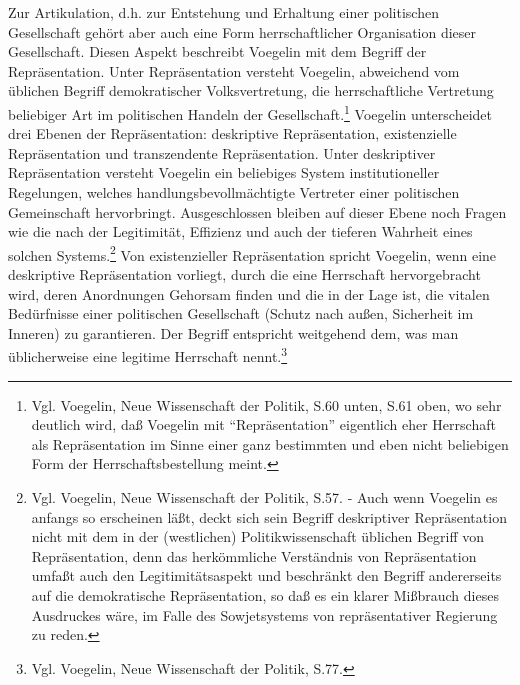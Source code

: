Zur Artikulation, d.h. zur Entstehung und Erhaltung einer politischen
Gesellschaft gehört aber auch eine Form herrschaftlicher Organisation dieser
Gesellschaft. Diesen Aspekt beschreibt Voegelin mit dem Begriff der
Repräsentation. Unter Repräsentation versteht Voegelin, abweichend vom üblichen
Begriff demokratischer Volksvertretung, die herrschaftliche Vertretung
beliebiger Art im politischen Handeln der Gesellschaft.\footnote{Vgl.
  Voegelin, Neue Wissenschaft der Politik, S.60 unten, S.61 oben, wo sehr
  deutlich wird, daß Voegelin mit "`Repräsentation"' eigentlich eher
  Herrschaft als Repräsentation im Sinne einer ganz bestimmten und eben nicht
  beliebigen Form der Herrschaftsbestellung meint.} Voegelin unterscheidet drei
Ebenen der Repräsentation: deskriptive Repräsentation, existenzielle
Repräsentation und transzendente Repräsentation. Unter deskriptiver
Repräsentation versteht Voegelin ein beliebiges System institutioneller
Regelungen, welches handlungsbevollmächtigte Vertreter einer politischen
Gemeinschaft hervorbringt. Ausgeschlossen bleiben auf dieser Ebene noch Fragen
wie die nach der Legitimität, Effizienz und auch der tieferen Wahrheit eines
solchen Systems.\footnote{Vgl. Voegelin, Neue Wissenschaft der Politik, S.57.
  - Auch wenn Voegelin es anfangs so erscheinen läßt, deckt sich sein Begriff
  deskriptiver Repräsentation nicht mit dem in der (westlichen)
  Politikwissenschaft üblichen Begriff von Repräsentation, denn das
  herkömmliche Verständnis von Repräsentation umfaßt auch den
  Legitimitätsaspekt und beschränkt den Begriff andererseits auf die
  demokratische Repräsentation, so daß es ein klarer Mißbrauch dieses
  Ausdruckes wäre, im Falle des Sowjetsystems von repräsentativer Regierung zu
  reden.} Von existenzieller Repräsentation spricht Voegelin, wenn eine
deskriptive Repräsentation vorliegt, durch die eine Herrschaft hervorgebracht
wird, deren Anordnungen Gehorsam finden und die in der Lage ist, die vitalen
Bedürfnisse einer politischen Gesellschaft (Schutz nach außen, Sicherheit im
Inneren) zu garantieren. Der Begriff entspricht weitgehend dem, was man
üblicherweise eine legitime Herrschaft nennt.\footnote{Vgl. Voegelin, Neue
  Wissenschaft der Politik, S.77.}

